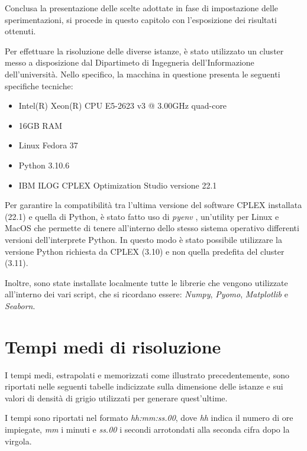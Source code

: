 Conclusa la presentazione delle scelte adottate in fase di impostazione delle sperimentazioni, 
si procede in questo capitolo con l'esposizione dei risultati ottenuti. 

Per effettuare la risoluzione delle diverse istanze, è stato utilizzato un cluster messo a disposizione dal Dipartimeto di Ingegneria dell'Informazione 
dell'università. Nello specifico, la macchina in questione presenta le seguenti specifiche tecniche:
\begin{itemize}
\item Intel(R) Xeon(R) CPU E5-2623 v3 @ 3.00GHz quad-core
\item 16GB RAM
\item Linux Fedora 37
\item Python 3.10.6
\item IBM ILOG CPLEX Optimization Studio versione 22.1
\end{itemize}
Per garantire la compatibilità tra l'ultima versione del software CPLEX installata (22.1) e quella di Python, è stato fatto uso di \textit{pyenv} \cite{pyenv}, 
un'utility per Linux e MacOS che permette di tenere all'interno dello stesso sistema operativo differenti versioni dell'interprete Python. In questo modo 
è stato possibile utilizzare la versione Python richiesta da CPLEX (3.10) e non quella predefita del cluster (3.11).

Inoltre, sono state installate localmente tutte le librerie che vengono utilizzate all'interno dei vari script, che si ricordano 
essere: \textit{Numpy}, \textit{Pyomo}, \textit{Matplotlib} e \textit{Seaborn}.

\newpage
\section{Tempi medi di risoluzione}
I tempi medi, estrapolati e memorizzati come illustrato precedentemente, sono riportati nelle seguenti tabelle indicizzate sulla dimensione delle istanze 
e sui valori di densità di grigio utilizzati per generare quest'ultime.

I tempi sono riportati nel formato \textit{hh:mm:ss.00}, dove \textit{hh} indica il numero di ore impiegate, \textit{mm} i minuti e \textit{ss.00} i secondi arrotondati 
alla seconda cifra dopo la virgola. \\

